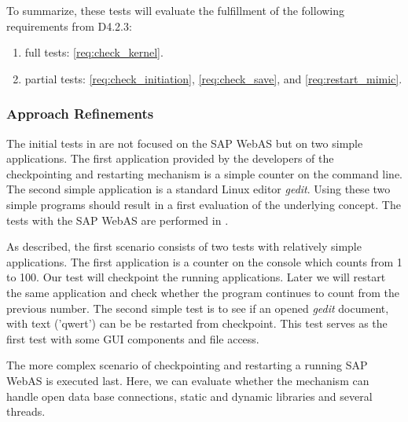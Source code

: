 To summarize, these tests will evaluate the fulfillment of the following requirements from D4.2.3:
\begin{enumerate}
	\item full tests: \ref{req:check_kernel}.
	\item partial tests: \ref{req:check_initiation}, \ref{req:check_save}, and \ref{req:restart_mimic}.
\end{enumerate}


\subsubsection{Approach Refinements}
The initial tests in  are not focused on the SAP WebAS but on two simple applications. The first application provided by the developers of the checkpointing and restarting mechanism is a simple counter on the command line. The second simple application is a standard Linux editor \emph{gedit}. Using these two simple programs should result in a first evaluation of the underlying concept. The tests with the SAP WebAS are performed in .

As described, the first scenario consists of two tests with relatively simple applications. The first application is a counter on the console which counts from 1 to 100. Our test will checkpoint the running applications. Later we will restart the same application and check whether the program continues to count from the previous number. The second simple test is to see if an opened \emph{gedit} document, with text ('qwert') can be be restarted from checkpoint. This test serves as the first test with some GUI components and file access.

The more complex scenario of checkpointing and restarting a running SAP WebAS is executed last. Here, we can evaluate whether the mechanism can handle open data base connections, static and dynamic libraries and several threads.


